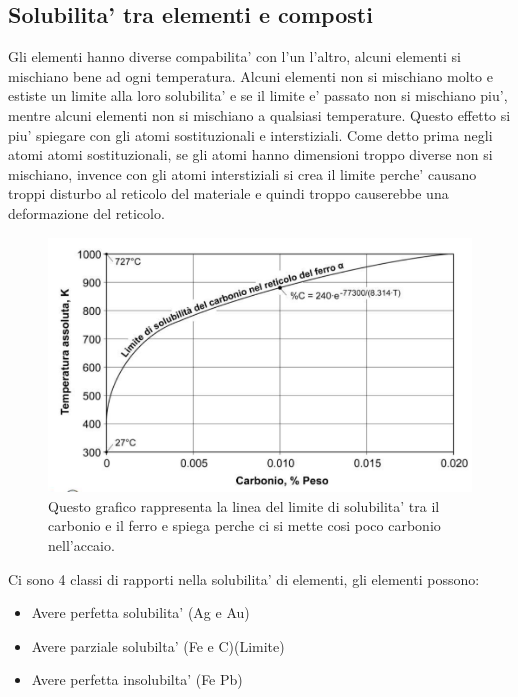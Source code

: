 \documentclass{article}
\begin{document}
        \subsection{Solubilita' tra elementi e composti}
        Gli elementi hanno diverse compabilita' con l'un l'altro, alcuni elementi si mischiano bene ad ogni temperatura. Alcuni elementi non si mischiano 
        molto e estiste un limite alla loro solubilita' e se il limite e' passato non si mischiano piu', mentre alcuni elementi non si mischiano a qualsiasi temperature.
        Questo effetto si piu' spiegare con gli atomi sostituzionali e interstiziali. Come detto prima negli atomi atomi sostituzionali, se gli atomi hanno dimensioni 
        troppo diverse non si mischiano, invence con gli atomi interstiziali si crea il limite perche' causano troppi disturbo al reticolo del materiale e quindi troppo 
        causerebbe una deformazione del reticolo.
        \begin{figure}
            \centering
            \includegraphics[width=.85\linewidth]{Solubilita'.png}
            \caption{Questo grafico rappresenta la linea del limite di solubilita' tra il carbonio e il ferro e spiega perche ci si mette cosi poco carbonio nell'accaio.}
        \end{figure}
        \newline \newline Ci sono 4 classi di rapporti nella solubilita' di elementi, gli elementi possono:
        \begin{itemize}
            \item Avere perfetta solubilita' (Ag e Au)
            \item Avere parziale solubilta' (Fe e C)(Limite)
            \item Avere perfetta insolubilta' (Fe Pb)
        \end{itemize}
\end{document}
